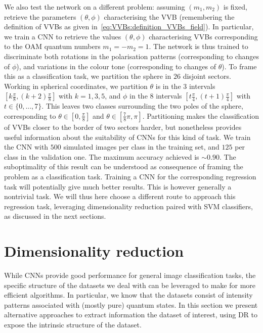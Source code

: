 We also test the network on a different problem: assuming $(m_1,m_2)$ is fixed, retrieve the parameters $(\theta,\phi)$ characterising the VVB (remembering the definition of VVBs as given in~\cref{eq:VVBs:definition_VVBs_field}).
In particular, we train a CNN to retrieve the values $(\theta,\phi)$ characterising VVBs corresponding to the OAM quantum numbers $m_1=-m_2=1$.
The network is thus trained to discriminate both rotations in the polarisation patterns (corresponding to changes of $\phi$), and variations in the colour tone (corresponding to changes of $\theta$).
To frame this as a classification task, we partition the sphere in $26$ disjoint sectors.
Working in spherical coordinates, we partition $\theta$ is in the $3$ intervals $\left[k \frac{\pi}{8}, (k+2) \frac{\pi}{8}\right]$ with $k=1,3,5$, and $\phi$ in the $8$ intervals $\left[t \frac{\pi}{4}, (t+1) \frac{\pi}{4}\right]$ with $t \in \{0,...,7\}$.
This leaves two classes surrounding the two poles of the sphere, corresponding to $\theta \in \left[0, \frac{\pi}{8}\right]$ and $\theta\in\left[ \frac{7}{8} \pi, \pi\right]$.
Partitioning makes the classification of VVBs closer to the border of two sectors harder, but nonetheless provides useful information about the suitability of CNNs for this kind of task.
We train the CNN with $500$ simulated images per class in the training set, and $125$ per class in the validation one. The maximum accuracy  achieved is $\sim 0.90$.
The suboptimality of this result can be understood as consequence of framing the problem as a classification task. Training a CNN for the corresponding regression task will potentially give much better results. This is however generally a nontrivial task. We will thus here choose a different route to approach this regression task, leveraging dimensionality reduction paired with SVM classifiers, as discussed in the next sections.


\section{Dimensionality reduction}
\label{sec:VVBs:dimensionality_reduction}

While CNNs provide good performance for general image classification tasks, the specific structure of the datasets we deal with can be leveraged to make for more efficient algorithms. In particular, we know that the datasets consist of intensity patterns associated with (mostly pure) quantum states.
In this section we present alternative approaches to extract information the dataset of interest, using \ac{DR} to expose the intrinsic structure of the dataset.


